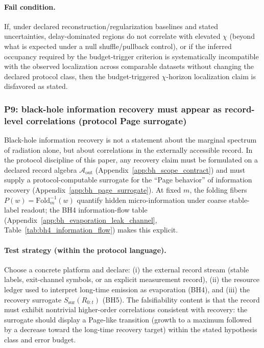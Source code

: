 \paragraph{Fail condition.}
If, under declared reconstruction/regularization baselines and stated uncertainties, delay-dominated regions do not correlate with elevated $\chi$ (beyond what is expected under a null shuffle/pullback control),
or if the inferred occupancy required by the budget-trigger criterion is systematically incompatible with the observed localization across comparable datasets without changing the declared protocol class,
then the budget-triggered $\chi$-horizon localization claim is disfavored as stated.

\subsubsection{P9: black-hole information recovery must appear as record-level correlations (protocol Page surrogate)}
\label{subsec:p9_bh_page_surrogate}

Black-hole information recovery is not a statement about the marginal spectrum of radiation alone, but about correlations in the externally accessible record.
In the protocol discipline of this paper, any recovery claim must be formulated on a declared record algebra $\mathcal{A}_{\mathrm{out}}$ (Appendix~\ref{app:bh_scope_contract}) and must supply a protocol-computable surrogate for the ``Page behavior'' of information recovery (Appendix~\ref{app:bh_page_surrogate}).
At fixed $m$, the folding fibers $P(w)=\mathrm{Fold}_m^{-1}(w)$ quantify hidden micro-information under coarse stable-label readout; the BH4 information-flow table (Appendix~\ref{app:bh_evaporation_leak_channel}, Table~\ref{tab:bh4_information_flow}) makes this explicit.

\paragraph{Test strategy (within the protocol language).}
Choose a concrete platform and declare:
(i) the external record stream (stable labels, exit-channel symbols, or an explicit measurement record),
(ii) the resource ledger used to interpret long-time emission as evaporation (BH4),
and (iii) the recovery surrogate $S_{\mathrm{sur}}(R_{0:t})$ (BH5).
The falsifiability content is that the record must exhibit nontrivial higher-order correlations consistent with recovery: the surrogate should display a Page-like transition (growth to a maximum followed by a decrease toward the long-time recovery target) within the stated hypothesis class and error budget.

